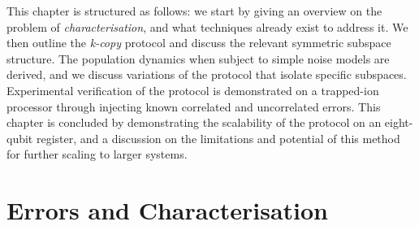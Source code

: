 This chapter is structured as follows: we start by giving an overview on the problem of \emph{characterisation}, and what techniques already exist to address it. We then outline the \emph{k-copy} protocol and discuss the relevant symmetric subspace structure. The population dynamics when subject to simple noise models are derived, and we discuss variations of the protocol that isolate specific subspaces. Experimental verification of the protocol is demonstrated on a trapped-ion processor through injecting known correlated and uncorrelated errors. This chapter is concluded by demonstrating the scalability of the protocol on an eight-qubit register, and a discussion on the limitations and potential of this method for further scaling to larger systems.

\section{Errors and Characterisation}
\label{sec:k-copy_char}

